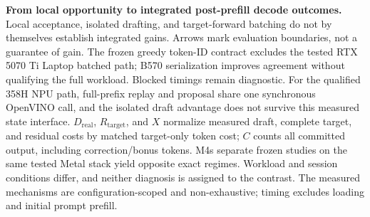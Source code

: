 \textbf{From local opportunity to integrated post-prefill decode outcomes.} Local acceptance, isolated drafting, and target-forward batching do not by themselves establish integrated gains. Arrows mark evaluation boundaries, not a guarantee of gain. The frozen greedy token-ID contract excludes the tested RTX 5070 Ti Laptop batched path; B570 serialization improves agreement without qualifying the full workload. Blocked timings remain diagnostic. For the qualified 358H NPU path, full-prefix replay and proposal share one synchronous OpenVINO call, and the isolated draft advantage does not survive this measured state interface. $D_{\mathrm{real}}$, $R_{\mathrm{target}}$, and $X$ normalize measured draft, complete target, and residual costs by matched target-only token cost; $C$ counts all committed output, including correction/bonus tokens. M4\textquotesingle s separate frozen studies on the same tested Metal stack yield opposite exact regimes. Workload and session conditions differ, and neither diagnosis is assigned to the contrast. The measured mechanisms are configuration-scoped and non-exhaustive; timing excludes loading and initial prompt prefill.
